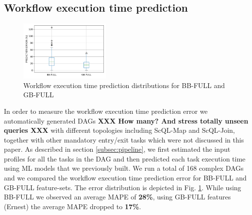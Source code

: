 \documentclass[a4paper, 10pt, conference]{ieeeconf}      %
\begin{document}
\subsection{Workflow execution time prediction}
\label{subsec:results-workflow}
\begin{figure}
  \centering
  \includegraphics[width=0.4\textwidth]{sources/wexec.png}
  \caption{Workflow execution time prediction distributions for BB-FULL and GB-FULL}
  \label{fig:workex-boxolot}
\end{figure}
In order to measure the workflow execution time prediction error we automatically generated DAGs \textbf{XXX How many? And stress totally unseen queries XXX} with different topologies including ScQL-Map and ScQL-Join, together with other mandatory entry/exit tasks which were not discussed in this paper. As described in section \ref{subsec:pipeline}, we first estimated the input profiles for all the tasks in the DAG and then predicted each task execution time using ML models that we previously built.
We run a total of 168 complex DAGs and we compared the workflow execution time prediction error for BB-FULL and GB-FULL feature-sets. The error distribution is depicted in Fig. \ref{fig:workex-boxolot}. While using BB-FULL we observed an average MAPE of \textbf{28\%}, using GB-FULL features (Ernest) the average MAPE dropped to \textbf{17\%}.  

\end{document}
